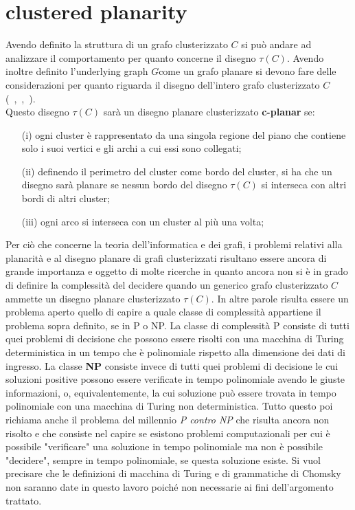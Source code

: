 {\section{clustered planarity}
Avendo definito la struttura di un grafo clusterizzato $C$ si può andare ad analizzare il comportamento per quanto concerne il disegno $\tau(C)$. 
Avendo inoltre definito l'underlying graph $G$come un grafo planare si devono fare delle considerazioni per quanto riguarda il disegno dell'intero grafo clusterizzato $C$(~\cite{feng1995planarity},~\cite{feng1997algorithms},~\cite{zbMATH05208230}).\\
Questo disegno $\tau(C)$ sarà un disegno planare clusterizzato \textbf{c-planar} se:\\
\begin{itemize}
	\item[(i)] ogni cluster è rappresentato da una singola regione del piano che contiene solo i suoi vertici e gli archi a cui essi sono collegati;
	\item[(ii)] definendo il perimetro del cluster come bordo del cluster, si ha che un disegno sarà planare se nessun bordo del disegno $\tau(C)$ si interseca con altri bordi di altri cluster;
	\item[(iii)] ogni arco si interseca con un cluster al più una volta;\\
\end{itemize}
Per ciò che concerne la teoria dell'informatica e dei grafi, i problemi relativi alla planarità e al disegno planare di grafi clusterizzati risultano essere ancora di grande importanza e oggetto di molte ricerche in quanto ancora non si è in grado di definire la complessità del decidere quando un generico grafo clusterizzato $C$ ammette un disegno planare clusterizzato $\tau(C)$.
In altre parole risulta essere un problema aperto quello di capire a quale classe di complessità appartiene il problema sopra definito, se in P o NP. La classe di complessità P consiste di tutti quei problemi di decisione che possono essere risolti con una macchina di Turing deterministica in un tempo che è polinomiale rispetto alla dimensione dei dati di ingresso. La classe \textbf{NP} consiste invece di tutti quei problemi di decisione le cui soluzioni positive possono essere verificate in tempo polinomiale avendo le giuste informazioni, o, equivalentemente, la cui soluzione può essere trovata in tempo polinomiale con una macchina di Turing non deterministica. Tutto questo poi richiama anche il problema del millennio \textit{P contro NP} che risulta ancora non risolto e che consiste nel capire se esistono problemi computazionali per cui è possibile "verificare" una soluzione in tempo polinomiale ma non è possibile "decidere", sempre in tempo polinomiale, se questa soluzione esiste. 
Si vuol precisare che le definizioni di macchina di Turing e di grammatiche di Chomsky non saranno date in questo lavoro poiché non necessarie ai fini dell'argomento trattato.
}